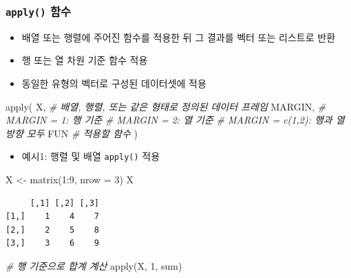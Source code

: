 \documentclass[
  11pt,
]{krantz}
\newenvironment{Shaded}{\begin{snugshade}}{\end{snugshade}}
\newcommand{\AttributeTok}[1]{\textcolor[rgb]{0.61,0.61,0.61}{#1}}
\newcommand{\CommentTok}[1]{\textcolor[rgb]{0.37,0.37,0.37}{\textit{#1}}}
\newcommand{\DecValTok}[1]{\textcolor[rgb]{0.06,0.06,0.06}{#1}}
\newcommand{\FunctionTok}[1]{\textcolor[rgb]{0,0,0}{#1}}
\newcommand{\NormalTok}[1]{#1}
\newcommand{\OtherTok}[1]{\textcolor[rgb]{0.37,0.37,0.37}{#1}}
\newcommand{\SpecialCharTok}[1]{\textcolor[rgb]{0,0,0}{#1}}
\providecommand{\tightlist}{%
  \setlength{\itemsep}{0pt}\setlength{\parskip}{0pt}}
\begin{document}
\hypertarget{apply}{%
\subsubsection*{\texorpdfstring{\texttt{apply()} 함수}{apply() 함수}}\label{apply}}


\begin{itemize}
\tightlist
\item
  배열 또는 행렬에 주어진 함수를 적용한 뒤 그 결과를 벡터 또는 리스트로 반환
\item
  행 또는 열 차원 기준 함수 적용
\item
  동일한 유형의 벡터로 구성된 데이터셋에 적용
\end{itemize}

\footnotesize

\begin{Shaded}
\begin{Highlighting}[]
\FunctionTok{apply}\NormalTok{(}
\NormalTok{  X, }\CommentTok{\# 배열, 행렬, 또는 같은 형태로 정의된 데이터 프레임}
\NormalTok{  MARGIN, }\CommentTok{\# MARGIN = 1: 행 기준}
          \CommentTok{\# MARGIN = 2: 열 기준}
          \CommentTok{\# MARGIN = c(1,2): 행과 열 방향 모두}
\NormalTok{  FUN }\CommentTok{\# 적용할 함수 }
\NormalTok{  )}
\end{Highlighting}
\end{Shaded}

\normalsize

\begin{itemize}
\tightlist
\item
  예시1: 행렬 및 배열 \texttt{apply()} 적용
\end{itemize}

\footnotesize

\begin{Shaded}
\begin{Highlighting}[]
\NormalTok{X }\OtherTok{\textless{}{-}} \FunctionTok{matrix}\NormalTok{(}\DecValTok{1}\SpecialCharTok{:}\DecValTok{9}\NormalTok{, }\AttributeTok{nrow =} \DecValTok{3}\NormalTok{)}
\NormalTok{X}
\end{Highlighting}
\end{Shaded}

\begin{verbatim}
     [,1] [,2] [,3]
[1,]    1    4    7
[2,]    2    5    8
[3,]    3    6    9
\end{verbatim}

\begin{Shaded}
\begin{Highlighting}[]
\CommentTok{\# 행 기준으로 합계 계산}
\FunctionTok{apply}\NormalTok{(X, }\DecValTok{1}\NormalTok{, sum)}
\end{Highlighting}
\end{Shaded}
\end{document}
